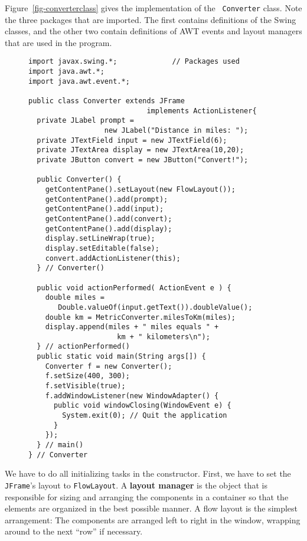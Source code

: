 
Figure~\ref{fig-converterclass} gives the implementation of the {\tt
Converter} class. Note the three packages that are imported.  The
first contains definitions of the Swing classes, and the other two
contain definitions of AWT events and layout managers that are used in
the program.

\begin{figure}[h!]
\jjjprogstart
\begin{jjjlisting}
\begin{lstlisting}
import javax.swing.*;             // Packages used
import java.awt.*;
import java.awt.event.*;

public class Converter extends JFrame 
                            implements ActionListener{
  private JLabel prompt = 
                  new JLabel("Distance in miles: ");
  private JTextField input = new JTextField(6);
  private JTextArea display = new JTextArea(10,20);
  private JButton convert = new JButton("Convert!");

  public Converter() {
    getContentPane().setLayout(new FlowLayout());
    getContentPane().add(prompt);
    getContentPane().add(input);
    getContentPane().add(convert);
    getContentPane().add(display);
    display.setLineWrap(true);
    display.setEditable(false);
    convert.addActionListener(this);
  } // Converter()

  public void actionPerformed( ActionEvent e ) {
    double miles = 
       Double.valueOf(input.getText()).doubleValue();
    double km = MetricConverter.milesToKm(miles);
    display.append(miles + " miles equals " + 
                     km + " kilometers\n");
  } // actionPerformed()
  public static void main(String args[]) {
    Converter f = new Converter();
    f.setSize(400, 300);
    f.setVisible(true);
    f.addWindowListener(new WindowAdapter() {      
      public void windowClosing(WindowEvent e) {
        System.exit(0); // Quit the application
      }
    });
  } // main()
} // Converter
\end{lstlisting}
\end{jjjlisting}
\end{figure}

We have to do all initializing tasks in the constructor.  First,
we have to set the {\tt JFrame}'s layout to {\tt FlowLayout}.  A {\bf
layout manager} is the object that is
responsible for sizing and arranging the components in a container so
that the elements are organized in the best possible manner.  A flow
layout is the simplest arrangement: The components are arranged left
to right in the window, wrapping around to the next ``row'' if
necessary.


